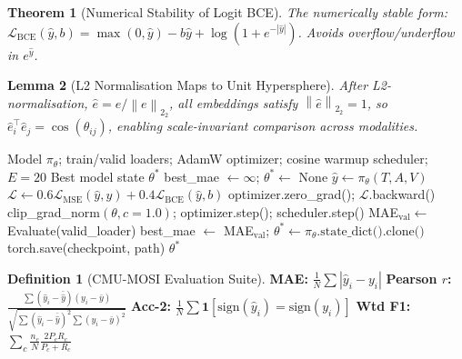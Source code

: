 \documentclass[12pt,a4paper]{article}
\theoremstyle{definition}
\newtheorem{definition}{Definition}[section]
\theoremstyle{plain}
\newtheorem{theorem}{Theorem}[section]
\newtheorem{lemma}[theorem]{Lemma}
\theoremstyle{remark}
\newcommand{\Norm}[1]{\left\|#1\right\|_2}
\begin{document}
\begin{theorem}[Numerical Stability of Logit BCE]
The numerically stable form: $\mathcal{L}_{\text{BCE}}(\hat{y},b) = \max(0,\hat{y}) - b\hat{y} + \log(1 + e^{-|\hat{y}|})$. Avoids overflow/underflow in $e^{\hat{y}}$.
\end{theorem}

\begin{lemma}[L2 Normalisation Maps to Unit Hypersphere]
After L2-normalisation, $\hat{e} = e/\Norm{e}_2$, all embeddings satisfy $\Norm{\hat{e}}_2 = 1$, so $\hat{e}_i^\top \hat{e}_j = \cos(\theta_{ij})$, enabling scale-invariant comparison across modalities.
\end{lemma}

\begin{algorithm}[H]
\caption{Full Training Loop — Pipeline E (20 Epochs, Best-Model Tracking)}
\label{alg:training_e}
\begin{algorithmic}[1]
\Require Model $\pi_\theta$; train/valid loaders; AdamW optimizer; cosine warmup scheduler; $E=20$
\Ensure Best model state $\theta^*$
\State best\_mae $\gets \infty$; $\theta^* \gets$ None
    \State $\hat{y} \gets \pi_\theta(T, A, V)$
    \State $\mathcal{L} \gets 0.6\mathcal{L}_{\text{MSE}}(\hat{y},y) + 0.4\mathcal{L}_{\text{BCE}}(\hat{y},b)$
    \State optimizer.zero\_grad(); $\mathcal{L}$.backward()
    \State clip\_grad\_norm$(\theta, c=1.0)$; optimizer.step(); scheduler.step()
  \EndFor
  \State MAE$_\text{val} \gets$ Evaluate(valid\_loader)
    \State best\_mae $\gets$ MAE$_\text{val}$; $\theta^* \gets \pi_\theta.\text{state\_dict().clone()}$
  \EndIf
  \State torch.save(checkpoint, path)
\EndFor
\State \Return $\theta^*$ 
\end{algorithmic}
\end{algorithm}

\begin{definition}[CMU-MOSI Evaluation Suite]
\textbf{MAE:} $\frac{1}{N}\sum|\hat{y}_i - y_i|$\quad
\textbf{Pearson $r$:} $\frac{\sum(\hat{y}_i-\bar{\hat{y}})(y_i-\bar{y})}{\sqrt{\sum(\hat{y}_i-\bar{\hat{y}})^2\sum(y_i-\bar{y})^2}}$\quad
\textbf{Acc-2:} $\frac{1}{N}\sum\mathbf{1}[\text{sign}(\hat{y}_i)=\text{sign}(y_i)]$\quad
\textbf{Wtd F1:} $\sum_c \frac{n_c}{N}\frac{2P_cR_c}{P_c+R_c}$
\end{definition}

\newpage
\end{document}
